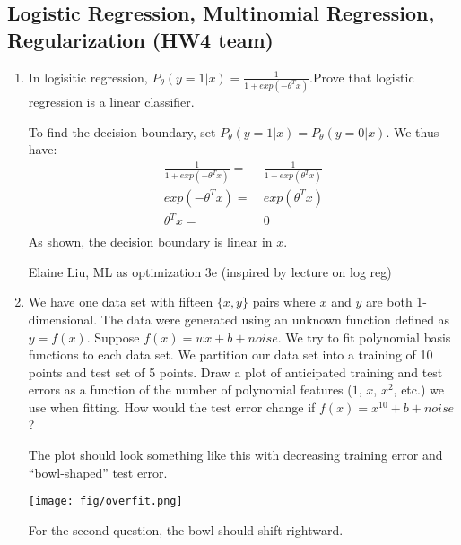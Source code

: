 \subsection{Logistic Regression, Multinomial Regression, Regularization (HW4 team)}
\begin{enumerate}
    
    
    \item In logisitic regression, $P_{\theta} (y=1|x) = \frac{1}{1 + exp(-\theta^T x)}$.Prove that logistic regression is a linear classifier. 
    
    \begin{soln}
    To find the decision boundary, set $P_{\theta} (y=1|x) = P_{\theta} (y=0|x)$. We thus have:
    \begin{align*}
        \frac{1}{1 + exp(-\theta^T x)} =&\ \frac{1}{1 + exp(\theta^T x)}\\
        exp(-\theta^T x) =&\ exp(\theta^T x)\\
       \theta^T x =&\ 0\\
    \end{align*}
    As shown, the decision boundary is linear in $x$.
    \end{soln}
    
    \begin{qauthor}
    Elaine Liu, ML as optimization 3e (inspired by lecture on log reg)
    \end{qauthor}
    
    
    \item We have one data set with fifteen $\{x,y\}$ pairs where $x$ and $y$ are both 1-dimensional. The data were generated using an unknown function defined as $y = f(x)$.  Suppose $f(x) = wx+b + noise$. We try to fit polynomial basis functions to each data set. We partition our data set into a training of 10 points and test set of 5 points. Draw a plot of anticipated training and test errors as a function of the number of polynomial features ($1$, $x$, $x^2$, etc.) we use when fitting. How would the test error change if $f(x) = x^{10}+b+noise$?
    
 
    \begin{soln}
    
    The plot should look something like this with decreasing training error and ``bowl-shaped'' test error.
    
\texttt{[image: fig/overfit.png]}

For the second question, the bowl should shift rightward.
\end{soln}
    

\end{enumerate}
